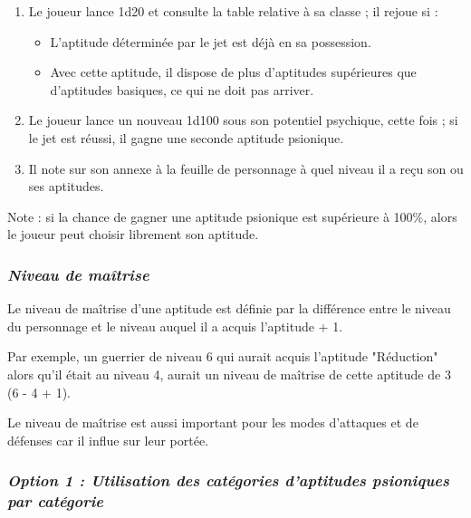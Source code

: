 \documentclass[11pt]{article}
\begin{document}
{\begin{enumerate}
\item Le joueur lance 1d20 et consulte la table relative à sa classe ; il rejoue si :
\begin{itemize}
\item L'aptitude déterminée par le jet est déjà en sa possession.
\item Avec cette aptitude, il dispose de plus d'aptitudes supérieures que d'aptitudes basiques, ce qui ne doit pas arriver.
\end{itemize}
\item Le joueur lance un nouveau 1d100 sous son potentiel psychique, cette fois ; si le jet est réussi, il gagne une seconde aptitude psionique.
\item Il note sur son annexe à la feuille de personnage à quel niveau il a reçu son ou ses aptitudes. \end{enumerate}

\bigskip

Note : si la chance de gagner une aptitude psionique est supérieure à 100\%, alors le joueur peut choisir librement son aptitude.

\subsubsection*{\textit{Niveau de maîtrise}}

Le niveau de maîtrise d'une aptitude est définie par la différence entre le niveau du personnage et le niveau auquel il a acquis l'aptitude + 1.

\bigskip

Par exemple, un guerrier de niveau  6 qui aurait acquis l'aptitude "Réduction" alors qu'il était au niveau 4, aurait un niveau de maîtrise de cette aptitude de 3 (6 - 4 + 1).

\bigskip

Le niveau de maîtrise est aussi important pour les modes d'attaques et de défenses car il influe sur leur portée.


\subsubsection*{\textit{Option 1 : Utilisation des catégories d'aptitudes psioniques par catégorie}}

}
\end{document}
